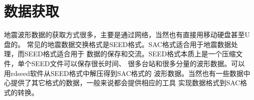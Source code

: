 \section{数据获取}
地震波形数据的获取方式很多，主要是通过网络，当然也有直接用移动硬盘甚至U盘的。
常见的地震数据交换格式是SEED格式。SAC格式适合用于地震数据处理，而SEED格式适合用于
数据的保存和交流。SEED格式本质上是一个压缩文件，单个SEED文件可以保存很长时间、
很多台站和很多分量的波形数据。可以用rdseed软件从SEED格式中解压得到SAC格式的
波形数据。当然也有一些数据中心提供了其它格式的数据，一般来说都会提供相应的工具
实现数据格式到SAC格式的转换。
